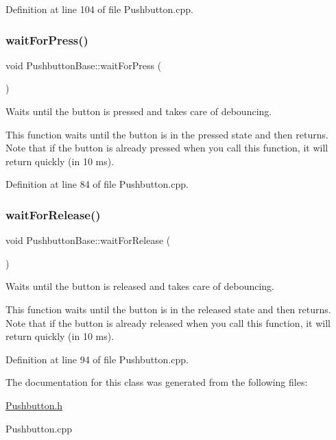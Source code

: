 Definition at line 104 of file Pushbutton.\+cpp.

\mbox{\label{class_pushbutton_base_a2e2787595c82ee0913ecf4c1eea4a2c8}} 
\subsubsection{\texorpdfstring{wait\+For\+Press()}{waitForPress()}}
{\footnotesize\ttfamily void Pushbutton\+Base\+::wait\+For\+Press (\begin{DoxyParamCaption}{ }\end{DoxyParamCaption})\hspace{0.3cm}{\ttfamily [inherited]}}



Waits until the button is pressed and takes care of debouncing. 

This function waits until the button is in the pressed state and then returns. Note that if the button is already pressed when you call this function, it will return quickly (in 10 ms). 

Definition at line 84 of file Pushbutton.\+cpp.

\mbox{\label{class_pushbutton_base_ae5fff34b3e1ebd62fd02b99edd6bf13a}} 
\subsubsection{\texorpdfstring{wait\+For\+Release()}{waitForRelease()}}
{\footnotesize\ttfamily void Pushbutton\+Base\+::wait\+For\+Release (\begin{DoxyParamCaption}{ }\end{DoxyParamCaption})\hspace{0.3cm}{\ttfamily [inherited]}}



Waits until the button is released and takes care of debouncing. 

This function waits until the button is in the released state and then returns. Note that if the button is already released when you call this function, it will return quickly (in 10 ms). 

Definition at line 94 of file Pushbutton.\+cpp.



The documentation for this class was generated from the following files\+:\begin{DoxyCompactItemize}
\item 
\hyperlink{_pushbutton_8h}{Pushbutton.\+h}\item 
Pushbutton.\+cpp\end{DoxyCompactItemize}
